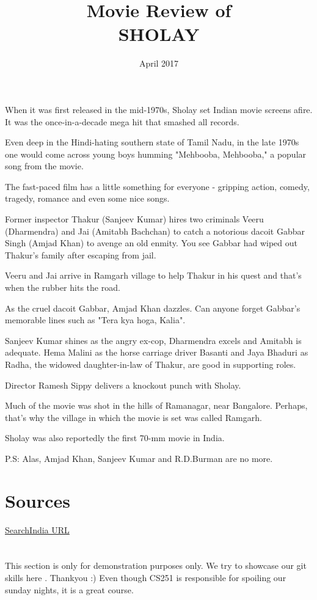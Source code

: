 \documentclass{article}
\title{Movie Review of\\\textsc{\LARGE{SHOLAY}}}
\date{April 2017}
\begin{document}
\maketitle

\section*{}

When it was first released in the mid-1970s, Sholay set Indian movie screens afire. It was the once-in-a-decade mega hit that smashed all records.

Even deep in the Hindi-hating southern state of Tamil Nadu, in the late 1970s one would come across young boys humming "Mehbooba, Mehbooba," a popular song from the movie.

The fast-paced film has a little something for everyone - gripping action, comedy, tragedy, romance and even some nice songs. 

Former inspector Thakur (Sanjeev Kumar) hires two criminals Veeru (Dharmendra) and Jai (Amitabh Bachchan) to catch a notorious dacoit Gabbar Singh (Amjad Khan) to avenge an old enmity. You see Gabbar had wiped out Thakur's family after escaping from jail.

Veeru and Jai arrive in Ramgarh village to help Thakur in his quest and that's when the rubber hits the road.

As the cruel dacoit Gabbar, Amjad Khan dazzles. Can anyone forget Gabbar's memorable lines such as "Tera kya hoga, Kalia".

Sanjeev Kumar shines as the angry ex-cop, Dharmendra excels and Amitabh is adequate. Hema Malini as the horse carriage driver Basanti and Jaya Bhaduri as Radha, the widowed daughter-in-law of Thakur, are good in supporting roles.

Director Ramesh Sippy delivers a knockout punch with Sholay.

Much of the movie was shot in the hills of Ramanagar, near Bangalore. Perhaps, that's why the village in which the movie is set was called Ramgarh.

Sholay was also reportedly the first 70-mm movie in India.

P.S: Alas, Amjad Khan, Sanjeev Kumar and R.D.Burman are no more.

\section*{Sources}
\href{http://www.searchindia.com/search/bollywood-movies/sholay.html}{SearchIndia URL}

\section*{}

This section is only for demonstration purposes only. We try to showcase our git skills here . Thankyou :)
Even though CS251 is responsible for spoiling our sunday nights, it is a great course. 
\end{document}
